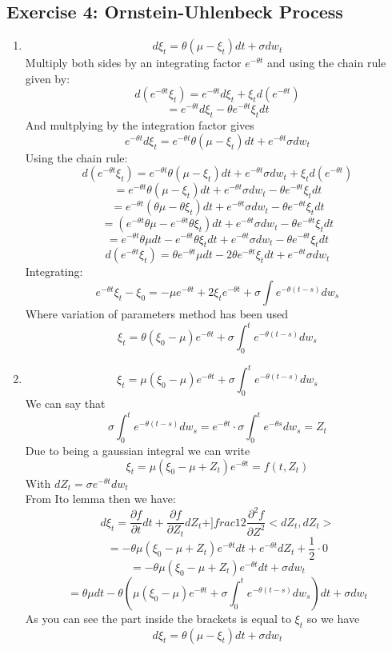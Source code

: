 \documentclass[10pt,a4paper,oneside]{article}
\begin{document}
    \subsection*{Exercise 4: Ornstein-Uhlenbeck Process}
    \begin{enumerate}
        \item $$ d \xi_t = \theta(\mu - \xi_t)dt + \sigma dw_t $$
        Multiply both sides by an integrating factor $e^{-\theta t} $ and using the chain rule given by:
        $$ d(e^{-\theta t} \xi_t) = e^{-\theta t} d \xi_t + \xi_t d(e^{-\theta t}) $$
        $$ = e^{-\theta t} d \xi_t - \theta e^{-\theta t} \xi_t dt $$
        And multplying by the integration factor gives 
        $$ e^{-\theta t} d \xi_t = e^{-\theta t}  \theta(\mu - \xi_t ) dt + e^{-\theta t}  \sigma dw_t $$
        Using the chain rule:
        $$ d(e^{-\theta t}  \xi_t )= e^{-\theta t} \theta(\mu-\xi_t)dt + e^{-\theta t} \sigma dw_t + \xi_t d(e^{-\theta t}) $$
        $$ = e^{-\theta t} \theta(\mu - \xi_t)dt + e^{-\theta t} \sigma dw_t - \theta e^{-\theta t} \xi_t dt $$
        $$ = e^{-\theta t}(\theta \mu - \theta \xi_t ) dt + e^{-\theta t} \sigma dw_t - \theta e^{-\theta t} \xi_t dt $$
        $$ = (e^{-\theta t} \theta \mu - e^{-\theta t} \theta \xi_t) dt + e^{-\theta t} \sigma dw_t - \theta e^{-\theta t} \xi_t dt $$
        $$ = e^{-\theta t} \theta \mu dt - e^{-\theta t} \theta \xi_t dt + e^{-\theta t} \sigma dw_t - \theta e^{-\theta t} \xi_t dt $$
        $$ d(e^{-\theta t} \xi_t ) = \theta e^{-\theta t} \mu dt - 2 \theta e^{-\theta t} \xi_t dt + e^{-\theta t} \sigma dw_t $$
        Integrating:
        $$ e^{-\theta t} \xi_t - \xi_0 = - \mu e^{-\theta t} + 2 \xi_t e^{-\theta t} + \sigma \int e^{-\theta (t-s)} dw_s $$ 
        Where variation of parameters method has been used
        $$ \xi_t = \theta(\xi_0 -\mu) e^{-\theta t} + \sigma \int_0^t e^{-\theta (t-s)} dw_s $$

        \item $$\xi_t = \mu(\xi_0 - \mu) e^{-\theta t} + \sigma \int_0^t e^{-\theta (t-s)} dw_s $$ 
        We can say that 
        $$ \sigma \int_0^t e^{-\theta (t-s)} dw_s = e^{-\theta t} \cdot \sigma \int_0^t e^{-\theta s} dw_s = Z_t $$
        Due to being a gaussian integral we can write
        $$ \xi_t = \mu(\xi_0 - \mu + Z_t) e^{-\theta t} = f(t,Z_t) $$
        With $dZ_t = \sigma e^{-\theta t} dw_t $ 
        \\
        From Ito lemma then we have:
        $$d \xi_t = \frac{\partial f}{\partial t} dt + \frac{\partial f}{\partial Z_t} d Z_t + ]frac{1}{2} \frac{\partial^2 f}{\partial Z^2} < dZ_t, dZ_t > $$ 
        $$ = -\theta \mu(\xi_0 -\mu + Z_t) e^{-\theta t} dt + e^{-\theta t} dZ_t + \frac{1}{2} \cdot 0 $$
        $$ = -\theta \mu(\xi_0 - \mu + Z_t) e^{-\theta t} dt + \sigma dw_t $$
        $$ = \theta \mu dt - \theta(\mu (\xi_0 - \mu) e^{-\theta t} + \sigma \int_0^t e^{-\theta (t-s)} dw_s) dt + \sigma dw_t $$
        As you can see the part inside the brackets is equal to $\xi_t$ so we have 
        $$ d \xi_t = \theta(\mu-\xi_t) dt + \sigma dw_t $$
    \end{enumerate}
    

    
\end{document}
